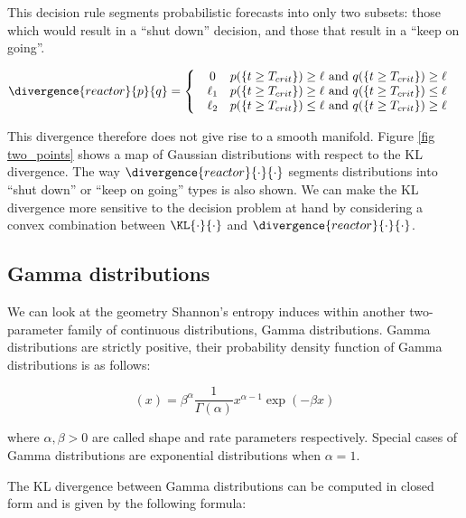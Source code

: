 This decision rule segments probabilistic forecasts into only two subsets: those which would result in a ``shut down'' decision, and those that result in a ``keep on going''. 

\begin{equation}
	\divergence{reactor}{p}{q} = \left\{
	\begin{array}{cc} 
	    \begin{array}{cc}
	      0        & p(\{t\geq T_{crit}\}) \geq \ell \mbox{ and } q(\{t\geq T_{crit}\}) \geq \ell\\
	      \ell_1 & p(\{t\geq T_{crit}\})  \geq \ell \mbox{ and } q(\{t\geq T_{crit}\}) \leq \ell\\
	      \ell_2 & p(\{t\geq T_{crit}\})  \leq \ell \mbox{ and } q(\{t\geq T_{crit}\}) \geq \ell
	    \end{array}
	\end{array}
	\right.
\end{equation}

This divergence therefore does not give rise to a smooth manifold. Figure \ref{fig two_points} shows a map of Gaussian distributions with respect to the KL divergence. The way $\divergence{reactor}{\cdot}{\cdot}$ segments distributions into ``shut down'' or ``keep on going'' types is also shown. We can make the KL divergence more sensitive to the decision problem at hand by considering a convex combination between $\KL{\cdot}{\cdot}$ and $\divergence{reactor}{\cdot}{\cdot}$.

\subsection{Gamma distributions}

We can look at the geometry Shannon's entropy induces within another two-parameter family of continuous distributions, Gamma distributions. Gamma distributions are strictly positive, their probability density function of Gamma distributions is as follows:

\begin{equation}
(x) = \beta^{\alpha}\frac{1}{\Gamma(\alpha)} x^{\alpha-1} \exp(-\beta x)
\end{equation}

where $\alpha,\beta > 0$ are called shape and rate parameters respectively. Special cases of Gamma distributions are exponential distributions when $\alpha=1$.

The KL divergence between Gamma distributions can be computed in closed form and is given by the following formula:

